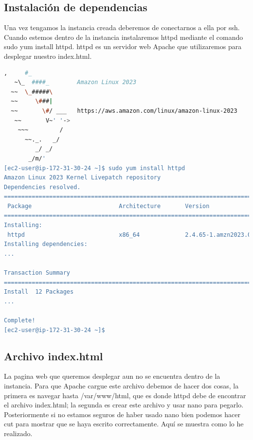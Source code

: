 \documentclass{article}
\begin{document}
	\subsection{Instalación de dependencias}

		Una vez tengamos la instancia creada deberemos de conectarnos a ella por ssh. Cuando estemos dentro de la instancia instalaremos httpd mediante el comando sudo yum install httpd. httpd es un servidor web Apache que utilizaremos para desplegar nuestro index.html.


\begin{lstlisting}[style=consola, language=bash, caption={Terminal, dependencias}]
   ,     #_
   ~\_  ####_        Amazon Linux 2023
  ~~  \_#####\
  ~~     \###|
  ~~       \#/ ___   https://aws.amazon.com/linux/amazon-linux-2023
   ~~       V~' '->
    ~~~         /
      ~~._.   _/
         _/ _/
       _/m/'
[ec2-user@ip-172-31-30-24 ~]$ sudo yum install httpd
Amazon Linux 2023 Kernel Livepatch repository                                           177 kB/s |  23 kB     00:00
Dependencies resolved.
==================================================================================
 Package                         Architecture       Version                               Repository               Size
==================================================================================
Installing:
 httpd                           x86_64             2.4.65-1.amzn2023.0.1                 amazonlinux              47 k
Installing dependencies:
...

Transaction Summary
==================================================================================
Install  12 Packages
...

Complete!
[ec2-user@ip-172-31-30-24 ~]$

\end{lstlisting}

\subsection{Archivo index.html}

	La pagina web que queremos desplegar aun no se encuentra dentro de la instancia. Para que Apache cargue este archivo debemos de hacer dos cosas, la primera es navegar hasta /var/www/html, que es donde httpd debe de encontrar el archivo index.html; la segunda es crear este archivo y usar nano para pegarlo. Posteriormente si no estamos seguros de haber usado nano bien podemos hacer cut para mostrar que se haya escrito correctamente. Aquí se muestra como lo he realizado.
\end{document}
